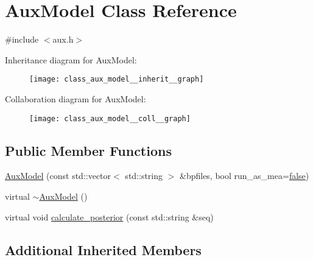 \hypertarget{class_aux_model}{\section{Aux\+Model Class Reference}
\label{class_aux_model}
}


{\ttfamily \#include $<$aux.\+h$>$}



Inheritance diagram for Aux\+Model\+:
\nopagebreak
\begin{figure}[H]
\begin{center}
\leavevmode
\texttt{[image: class\_aux\_model\_\_inherit\_\_graph]}
\end{center}
\end{figure}


Collaboration diagram for Aux\+Model\+:
\nopagebreak
\begin{figure}[H]
\begin{center}
\leavevmode
\texttt{[image: class\_aux\_model\_\_coll\_\_graph]}
\end{center}
\end{figure}
\subsection*{Public Member Functions}
\begin{DoxyCompactItemize}
\item 
\hyperlink{class_aux_model_a3593c40ae6fb3c7143365fdf9784b6bf}{Aux\+Model} (const std\+::vector$<$ std\+::string $>$ \&bpfiles, bool run\+\_\+as\+\_\+mea=\hyperlink{naview_8c_a65e9886d74aaee76545e83dd09011727}{false})
\item 
virtual \hyperlink{class_aux_model_ae796ee47f2d0255c48be4b62a3811e70}{$\sim$\+Aux\+Model} ()
\item 
virtual void \hyperlink{class_aux_model_aa0351133a58e0038f55580dbf4f925c8}{calculate\+\_\+posterior} (const std\+::string \&seq)
\end{DoxyCompactItemize}
\subsection*{Additional Inherited Members}


